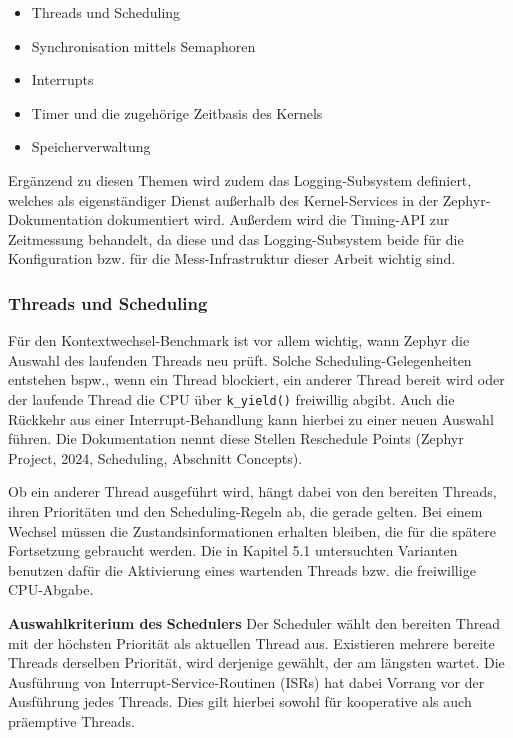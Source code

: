 \begin{itemize}
\item Threads und Scheduling
\item Synchronisation mittels Semaphoren
\item Interrupts
\item Timer und die zugeh{\"o}rige Zeitbasis des Kernels
\item Speicherverwaltung
\end{itemize}
Erg{\"a}nzend zu diesen Themen wird zudem das Logging-Subsystem definiert, welches als eigenst{\"a}ndiger Dienst au{\ss}erhalb des Kernel-Services in der Zephyr-Dokumentation dokumentiert wird. Au{\ss}erdem wird die Timing-API zur Zeitmessung behandelt, da diese und das Logging-Subsystem beide f{\"u}r die Konfiguration bzw. f{\"u}r die Mess-Infrastruktur dieser Arbeit wichtig sind.

\subsubsection{Threads und Scheduling}
F{\"u}r den Kontextwechsel-Benchmark ist vor allem wichtig, wann Zephyr die Auswahl des laufenden Threads neu pr{\"u}ft. Solche Scheduling-Gelegenheiten entstehen bspw., wenn ein Thread blockiert, ein anderer Thread bereit wird oder der laufende Thread die CPU {\"u}ber \lstinline[style=fileinline]|k_yield()| freiwillig abgibt. Auch die R{\"u}ckkehr aus einer Interrupt-Behandlung kann hierbei zu einer neuen Auswahl f{\"u}hren. Die Dokumentation nennt diese Stellen Reschedule Points (Zephyr Project, 2024, \glqq{}Scheduling\grqq{}, Abschnitt \glqq{}Concepts\grqq{}).

Ob ein anderer Thread ausgef{\"u}hrt wird, h{\"a}ngt dabei von den bereiten Threads, ihren Priorit{\"a}ten und den Scheduling-Regeln ab, die gerade gelten. Bei einem Wechsel m{\"u}ssen die Zustandsinformationen erhalten bleiben, die f{\"u}r die sp{\"a}tere Fortsetzung gebraucht werden. Die in Kapitel 5.1 untersuchten Varianten benutzen daf{\"u}r die Aktivierung eines wartenden Threads bzw. die freiwillige CPU-Abgabe.

\textbf{Auswahlkriterium des} \textbf{Schedulers} Der Scheduler w{\"a}hlt den bereiten Thread mit der h{\"o}chsten Priorit{\"a}t als aktuellen Thread aus. Existieren mehrere bereite Threads derselben Priorit{\"a}t, wird derjenige gew{\"a}hlt, der am l{\"a}ngsten wartet. Die Ausf{\"u}hrung von Interrupt-Service-Routinen (ISRs) hat dabei Vorrang vor der Ausf{\"u}hrung jedes Threads. Dies gilt hierbei sowohl f{\"u}r kooperative als auch pr{\"a}emptive Threads.

